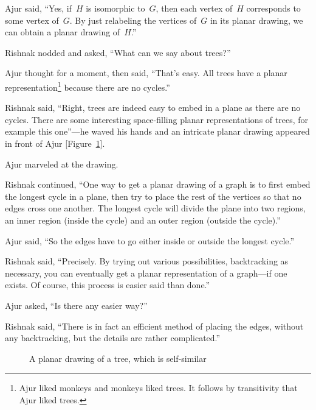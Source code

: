 Ajur said, ``Yes, if~$H$ is isomorphic to~$G$, then each vertex of~$H$ corresponds to some vertex of~$G$. By just relabeling the vertices of~$G$ in its planar drawing, we can obtain a planar drawing of~$H$.''

Rishnak nodded and asked, ``What can we say about trees?''

Ajur thought for a moment, then said, ``That's easy. All trees have a planar representation\footnote{Ajur liked monkeys and monkeys liked trees. It follows by transitivity that Ajur liked trees.} because there are no cycles.''

Rishnak said, ``Right, trees are indeed easy to embed in a plane as there are no cycles. There are some interesting space-filling planar representations of trees, for example this one''---he waved his hands and an intricate planar drawing appeared in front of Ajur [Figure~\ref{9g7}].

Ajur marveled at the drawing.

Rishnak continued, ``One way to get a planar drawing of a graph is to first embed the longest cycle in a plane, then try to place the rest of the vertices so that no edges cross one another. The longest cycle will divide the plane into two regions, an inner region (inside the cycle) and an outer region (outside the cycle).''

Ajur said, ``So the edges have to go either inside or outside the longest cycle.''

Rishnak said, ``Precisely. By trying out various possibilities, backtracking as necessary, you can eventually get a planar representation of a graph---if one exists. Of course, this process is easier said than done.''

Ajur asked, ``Is there any easier way?''

Rishnak said, ``There is in fact an efficient method of placing the edges, without any backtracking, but the details are rather complicated.'' %

\begin{figure}
\begin{center}    

  \caption{A planar drawing of a tree, which is self-similar}\label{9g7}
  \end{center}
\end{figure}


